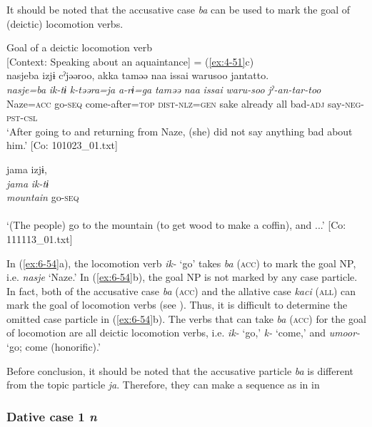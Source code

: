 It should be noted that the accusative case \textit{ba} can be used to mark the goal of (deictic) locomotion verbs.

\ea\label{ex:6-54}
 Goal of a deictic locomotion verb\\

 \ea {\TM}  [Context: Speaking about an aquaintance] = (\ref{ex:4-51}c)\\
\glll nasjeba  izjɨ  cˀjəəroo,  akka  taməə  naa  issai  warusoo  jantatto.\\
\textit{nasje=ba}  \textit{ik-tɨ}  \textit{k-təəra=ja}  \textit{a-rɨ=ga}  \textit{taməə}      \textit{naa}  \textit{issai}  \textit{waru-soo}  \textit{jˀ-an-tar-too}\\
Naze=\textsc{acc}  go-\textsc{seq}  come-after=\textsc{top}  \textsc{dist}-\textsc{nlz}=\textsc{gen}  sake    already  all  bad-\textsc{adj}  say-\textsc{neg}-\textsc{pst}-\textsc{csl}\\
\glt ‘After going to and returning from Naze, (she) did not say anything bad about him.’ [Co: 101023\_01.txt]
\z

\ex {\TM}  jama  izjɨ,\\
\glll \textit{jama}  \textit{ik-tɨ}\\
\textit{mountain}  go-\textsc{seq}\\\\
\glt ‘(The people) go to the mountain (to get wood to make a coffin), and ...’ [Co: 111113\_01.txt]
\z

In (\ref{ex:6-54}a), the locomotion verb \textit{ik-} ‘go’ takes \textit{ba} (\textsc{acc}) to mark the goal NP, i.e. \textit{nasje} ‘Naze.’ In (\ref{ex:6-54}b), the goal NP is not marked by any case particle. In fact, both of the accusative case \textit{ba} (\textsc{acc}) and the allative case \textit{kaci} (\textsc{all}) can mark the goal of locomotion verbs (see ). Thus, it is difficult to determine the omitted case particle in (\ref{ex:6-54}b). The verbs that can take \textit{ba} (\textsc{acc}) for the goal of locomotion are all deictic locomotion verbs, i.e. \textit{ik-} ‘go,’ \textit{k-} ‘come,’ and \textit{umoor-} ‘go; come (honorific).’

  Before conclusion, it should be noted that the accusative particle \textit{ba} is different from the topic particle \textit{ja}. Therefore, they can make a sequence as in  in 

\subsubsection{Dative case 1 \textit{n}}

